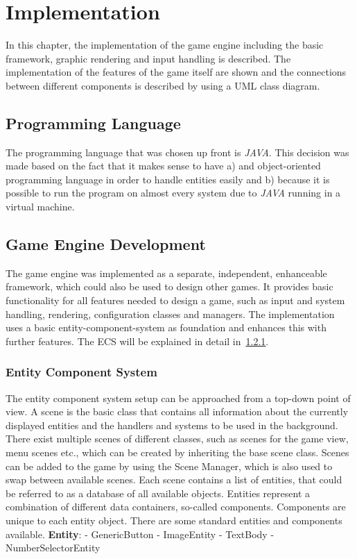 \section{Implementation}\label{sec:implementation}
In this chapter, the implementation of the game engine including the basic framework, graphic rendering and input handling is described.
The implementation of the features of the game itself are shown and the connections between different components is described by using a
UML class diagram.

\subsection{Programming Language}\label{subsec:programming-language}
The programming language that was chosen up front is \textit{JAVA}.
This decision was made based on the fact that it makes sense to have a) and object-oriented programming language in order to
handle entities easily and b) because it is possible to run the program on almost every system due to \textit{JAVA} running
in a virtual machine.

\subsection{Game Engine Development}\label{subsec:game-engine-development}
The game engine was implemented as a separate, independent, enhanceable framework, which could also be used to design other
games.
It provides basic functionality for all features needed to design a game, such as input and system handling, rendering, configuration
classes and managers.
The implementation uses a basic entity-component-system as foundation and enhances this with further features.
The ECS will be explained in detail in~\ref{subsubsec:entity-component-system2}.

\subsubsection{Entity Component System}\label{subsubsec:entity-component-system2}
The entity component system setup can be approached from a top-down point of view.
A scene is the basic class that contains all information about the currently displayed entities and the handlers and systems to be used
in the background.
There exist multiple scenes of different classes, such as scenes for the game view, menu scenes etc., which can be created by
inheriting the base scene class.
Scenes can be added to the game by using the Scene Manager, which is also used to swap between available scenes.
Each scene contains a list of entities, that could be referred to as a database of all available objects.
Entities represent a combination of different data containers, so-called components.
Components are unique to each entity object.
There are some standard entities and components available.
\textbf{Entity}:
- GenericButton
- ImageEntity
- TextBody
- NumberSelectorEntity

